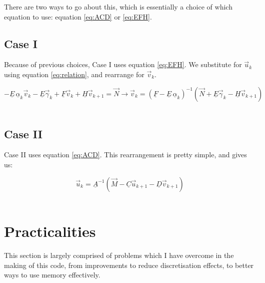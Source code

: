 \documentclass[11pt]{amsart}
\begin{document}
There are two ways to go about this, which is essentially a choice of which equation to use: equation \ref{eq:ACD} or \ref{eq:EFH}.

\subsection{Case I}

Because of previous choices, Case I uses equation \ref{eq:EFH}.  We substitute for $\vec{u}_{k}$ using equation \ref{eq:relation}, and rearrange for $\vec{v}_{k}$.

\begin{equation} \label{eq:Case_I}
- \underline{E} \, \underline{\alpha}_{k} \vec{v}_{k}  -  \underline{E} \vec{\gamma}_{k} + \underline{F} \vec{v}_{k} + \underline{H} \vec{v}_{k+1} = \vec{N}
\longrightarrow   \vec{v}_{k}  =  \left(  \underline{F}  -  \underline{E} \, \underline{\alpha}_{k}  \right)^{-1}  \left(  \vec{N}  +  \underline{E} \vec{\gamma}_{k}  -  \underline{H} \vec{v}_{k+1} \right)
\end{equation} 
\\



\subsection{Case II}

Case II uses equation \ref{eq:ACD}.  This rearrangement is pretty simple, and gives us:

\begin{equation} \label{eq:Case_II}
\vec{u}_{k}  =  \underline{A}^{-1}  \left(  \vec{M}  -  \underline{C} \vec{u}_{k+1}  -  \underline{D} \vec{v}_{k+1} \right)
\end{equation} 
\\









\section{Practicalities}

This section is largely comprised of problems which I have overcome in the making of this code, from improvements to reduce discretisation effects, to better ways to use memory effectively.
\end{document}
